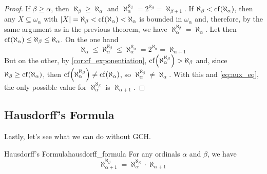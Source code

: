 \begin{proof}
    If $\beta\geq\alpha$, then $\aleph_\beta\geq\aleph_\alpha$ and $\aleph_\alpha^{\aleph_\beta}=2^{\aleph_\beta}=\aleph_{\beta+1}$. If $\aleph_\beta<\mathrm{cf}\!\left(\aleph_\alpha\right)$, then any $X\subseteq\omega_\alpha$ with $|X|=\aleph_\beta<\mathrm{cf}\!\left(\aleph_\alpha\right)<\aleph_\alpha$ is bounded in $\omega_\alpha$ and, therefore, by the same argument as in the previous theorem, we have $\aleph_\alpha^{\aleph_\beta}=\aleph_\alpha$. Let then $\mathrm{cf}\!\left(\aleph_\alpha\right)\leq\aleph_\beta\leq\aleph_\alpha$. On the one hand
    \begin{equation}\label{eq:aux_eq}
    \aleph_\alpha\leq\aleph_\alpha^{\aleph_\beta}\leq\aleph_\alpha^{\aleph_\alpha}=2^{\aleph_\alpha}=\aleph_{\alpha+1}
    \end{equation}
    But on the other, by \cref{cor:cf_exponentiation}, $\mathrm{cf}\!\left(\aleph_\alpha^{\aleph_\beta}\right)>\aleph_\beta$ and, since $\aleph_\beta\geq\mathrm{cf}\!\left(\aleph_\alpha\right)$, then $\mathrm{cf}\!\left(\aleph_\alpha^{\aleph_\beta}\right)\neq\mathrm{cf}\!\left(\aleph_\alpha\right)$, so $\aleph_\alpha^{\aleph_\beta}\neq\aleph_\alpha$. With this and \cref{eq:aux_eq}, the only possible value for $\aleph_\alpha^{\aleph_\beta}$ is $\aleph_{\alpha+1}$.
\end{proof}

\subsection{Hausdorff's Formula}

Lastly, let's see what we can do without GCH.

\begin{theorem}{Hausdorff's Formula}{hausdorff_formula}
    For any ordinals $\alpha$ and $\beta$, we have
    $$\aleph_{\alpha+1}^{\aleph_\beta}=\aleph_\alpha^{\aleph_\beta}\cdot\aleph_{\alpha+1}$$
\end{theorem}

